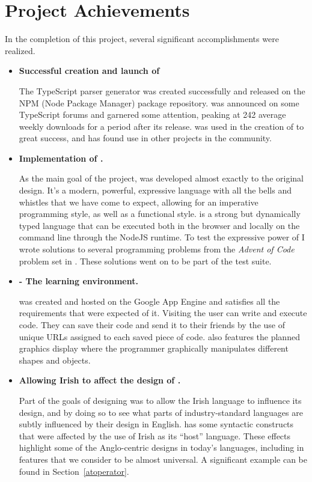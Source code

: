 \section{Project Achievements}
In the completion of this project, several significant accomplishments were realized.
\begin{itemize}
    \item \textbf{Successful creation and launch of \tsPEG{}}

        The TypeScript parser generator \tsPEG{} was created successfully and released on the NPM (Node Package Manager) package repository. \tsPEG{} was announced on some TypeScript forums and garnered some attention, peaking at 242 average weekly downloads for a period after its release. \tsPEG{} was used in the creation of \Setanta{} to great success, and has found use in other projects in the community.

    \item \textbf{Implementation of \Setanta{}.}

        As the main goal of the project, \Setanta{} was developed almost exactly to the original design. It's a modern, powerful, expressive language with all the bells and whistles that we have come to expect, allowing for an imperative programming style, as well as a functional style. \Setanta{} is a strong but dynamically typed language that can be executed both in the browser and locally on the command line through the NodeJS runtime. To test the expressive power of \Setanta{} I wrote solutions to several programming problems from the \emph{Advent of Code} problem set in \Setanta{}. These solutions went on to be part of the test suite.

    \item \textbf{\trys{} - The \Setanta{} learning environment.}

        \trys{} was created and hosted on the Google App Engine and satisfies all the requirements that were expected of it. Visiting \trys{} the user can write and execute \Setanta{} code. They can save their code and send it to their friends by the use of unique URLs assigned to each saved piece of code. \trys{} also features the planned graphics display where the programmer graphically manipulates different shapes and objects.

    \item \textbf{Allowing Irish to affect the design of \Setanta{}.}

        Part of the goals of designing \Setanta{} was to allow the Irish language to influence its design, and by doing so to see what parts of industry-standard languages are subtly influenced by their design in English. \Setanta{} has some syntactic constructs that were affected by the use of Irish as its ``host'' language. These effects highlight some of the Anglo-centric designs in today's languages, including in features that we consider to be almost universal. A significant example can be found in Section~\ref{atoperator}.


\end{itemize}
